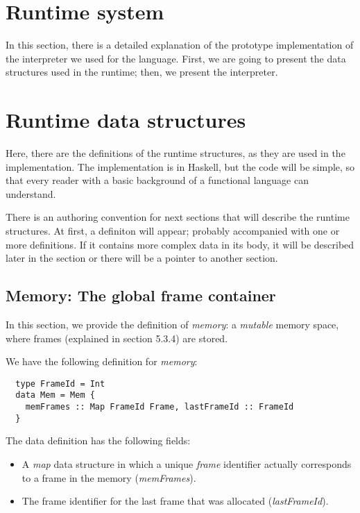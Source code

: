 \documentclass[diploma]{softlab-thesis}
\begin{document}
\section {Runtime system}

In this section, there is a detailed explanation of the prototype implementation of the interpreter we 
used for the language. First, we are going to present the data structures used in the runtime; then, we present 
the interpreter. 

\section{Runtime data structures}

Here, there are the definitions of the runtime structures, as they are used in the implementation. The 
implementation is in Haskell, but the code will be simple, so that every reader with a basic background of a functional 
language can understand.
\newline
\par There is an authoring convention for next sections that will describe the runtime structures. At first, a definiton 
will appear; probably accompanied with one or more definitions. If it contains more complex data in its body, it will be 
described later in the section or there will be a pointer to another section.

\subsection{Memory: The global frame container}

In this section, we provide the definition of \textit{memory}: 
a \textit{mutable} memory space, where frames (explained in section 5.3.4) are stored.

We have the following definition for \textit{memory}:
\begin{verbatim}
  type FrameId = Int
  data Mem = Mem {
    memFrames :: Map FrameId Frame, lastFrameId :: FrameId
  }
\end{verbatim}

The data definition has the following fields:
\begin{itemize}
  \item A \textit{map} data structure in which a unique \textit{frame} identifier actually corresponds to 
  a frame in the memory (\textit{memFrames}). 
  \item The frame identifier for the last frame that was allocated (\textit{lastFrameId}).
\end{itemize}
\end{document}
